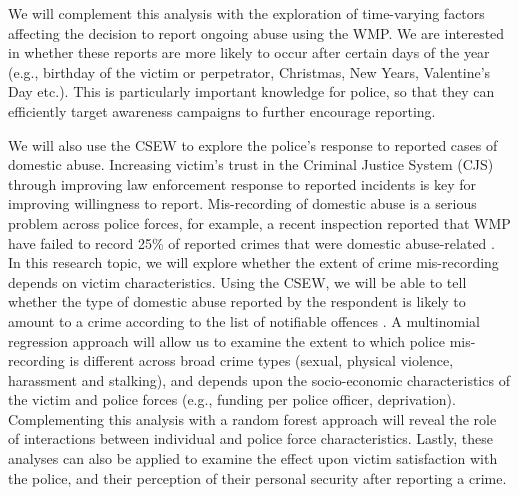 \documentclass[11pt, a4paper]{article}
\begin{document}
We will complement this analysis with the exploration of time-varying factors affecting the decision to report ongoing abuse using the WMP. We are interested in whether these reports are more likely to occur after certain days of the year (e.g., birthday of the victim or perpetrator, Christmas, New Years, Valentine's Day etc.). This is particularly important knowledge for police, so that they can efficiently target awareness campaigns to further encourage reporting.
 
 
%
%
%
%


We will also use the CSEW to explore the police's response to reported cases of domestic abuse. Increasing victim's trust in the Criminal Justice System (CJS) through improving law enforcement response to reported incidents is key for improving willingness to report. Mis-recording of domestic abuse is a serious problem across police forces, for example, a recent inspection reported that WMP have failed to record 25\% of reported crimes that were domestic abuse-related \cite{HerMajestysInspectorateofConstabularyandFires&RescueServices2019}. In this research topic, we will explore whether the extent of crime mis-recording depends on victim characteristics. Using the CSEW, we will be able to tell whether the type of domestic abuse reported by the respondent is likely to amount to a crime according to the list of notifiable offences \cite{countingrules}. A multinomial regression approach will allow us to examine the extent to which police mis-recording is different across broad crime types (sexual, physical violence, harassment and stalking), and depends upon the socio-economic characteristics of the victim and police forces (e.g., funding per police officer, deprivation). Complementing this analysis with a random forest approach will reveal the role of interactions between individual and police force characteristics. Lastly, these analyses can also be applied to examine the effect upon victim satisfaction with the police, and their perception of their personal security after reporting a crime.
\end{document}
